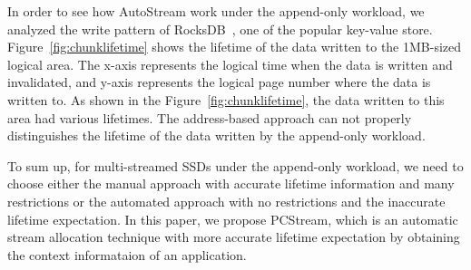 In order to see how AutoStream work under the append-only workload,
we analyzed the write pattern of RocksDB~\cite{RocksDB}, one of the popular key-value store.
Figure~\ref{fig:chunklifetime} shows the lifetime of the data written to the 1MB-sized logical area.
The x-axis represents the logical time when the data is written and invalidated, and y-axis
represents the logical page number where the data is written to.
As shown in the Figure~\ref{fig:chunklifetime}, the data written to this area had various lifetimes.
The address-based approach can not properly distinguishes the lifetime of the data written by
the append-only workload.

To sum up, for multi-streamed SSDs under the append-only workload, we need to choose either
the manual approach with accurate lifetime information and many restrictions
or the automated approach with no restrictions and the inaccurate lifetime expectation.
In this paper, we propose PCStream, which is an automatic stream allocation technique with
more accurate lifetime expectation by obtaining the context informataion of an application.

